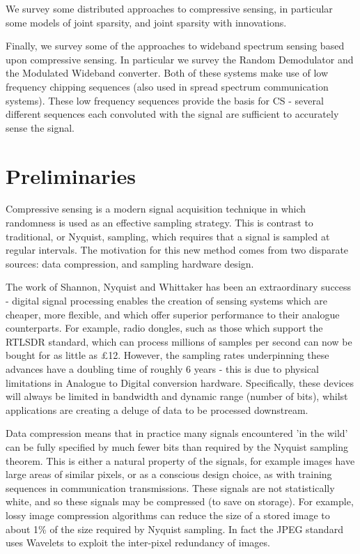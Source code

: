 We survey some distributed approaches to compressive sensing, in particular some models of joint sparsity, and joint sparsity with innovations.

Finally, we survey some of the approaches to wideband spectrum sensing based upon compressive sensing. In particular we survey the Random Demodulator and the Modulated Wideband converter. Both of these systems make use of low frequency chipping sequences (also used in spread spectrum communication systems). These low frequency sequences provide the basis for CS - several different sequences each convoluted with the signal are sufficient to accurately sense the signal. 

\section{Preliminaries}  \label{sec:prelims}

Compressive sensing is a modern signal acquisition technique in which randomness is used as an effective sampling strategy. This is contrast to traditional, or Nyquist, sampling, which requires that a signal is sampled at regular intervals. The motivation for this new method comes from two disparate sources: data compression, and sampling hardware design. 

The work of Shannon, Nyquist and Whittaker \cite{unser2000sampling,} has been an extraordinary success - digital signal processing enables the creation of sensing systems which are cheaper, more flexible, and which offer superior performance to their analogue counterparts. For example, radio dongles, such as those which support the RTLSDR standard, which can process millions of samples per second can now be bought for as little as £12. However, the sampling rates underpinning these advances have a doubling time of roughly 6 years - this is due to physical limitations in Analogue to Digital conversion hardware. Specifically, these devices will always be limited in bandwidth and dynamic range (number of bits), whilst applications are creating a deluge of data to be processed downstream.

Data compression means that in practice many signals encountered 'in the wild' can be fully specified by much fewer bits than required by the Nyquist sampling theorem. This is either a natural property of the signals, for example images have large areas of similar pixels, or as a conscious design choice, as with training sequences in communication transmissions. These signals are not statistically white, and so these signals may be compressed (to save on storage). For example, lossy image compression algorithms can reduce the size of a stored image to about 1\% of the size required by Nyquist sampling. In fact the JPEG standard uses Wavelets to exploit the inter-pixel redundancy of images.

